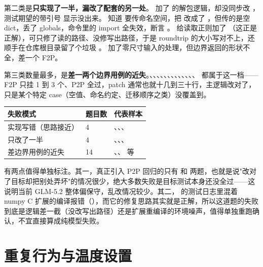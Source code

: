 \documentclass[UTF8,a4paper,11pt]{ctexart}
\begin{document}
第二类是\textbf{只实现了一半，漏改了配套的另一处}。 加了  的解包逻辑，却没同步改 ，测试期望的带引号  显示没出来。 知道  要传命名空间，把  改成了 ，但传的是空 dict，丢了 globals，命令里的 import 全失效，断言 。 给读取正则加了 （这正是正解），可只修了读的路径、没修写出路径，于是 roundtrip 的大小写对不上，还顺手在仓库根目录留了个垃圾 。 加了零尺寸输入的处理，但边界返回的形状不全，差一个 F2P。

第三类数量最多，是\textbf{差一两个边界用例的近失}。、、、、、、、、、、、、、 都属于这一档——F2P 只挂 1 到 3 个、P2P 全过，patch 通常也就十几到三十行，主逻辑改对了，只是某个特定 case（空值、命名约定、迁移顺序之类）没覆盖到。

\begin{center}
{\small
\begin{tabular}{L{3.6cm} C{1.4cm} L{8.6cm}}
\toprule
失败模式 & 题目数 & 代表样本 \\
\midrule
实现写错（思路接近） & 4 & 、、、 \\
只改了一半 & 4 & 、、、 \\
差边界用例的近失 & 14 & 、、 等 \\
\bottomrule
\end{tabular}
}
\end{center}

有两点值得单独标注。其一，真正引入 P2P 回归的只有  和  两题，也就是说"改对了目标却把别处弄坏"的情况很少，绝大多数失败是目标测试本身还没全过——这说明当前 GLM-5.2 整体偏保守，乱改情况较少。其二， 的测试日志里混着 numpy C 扩展的编译报错（），而它的修复思路其实就是正解，所以这道题的失败到底是逻辑差一截（没改写出路径）还是扩展重编译的环境噪声，值得单独重跑确认，不宜直接算成纯模型失败。

\section{重复行为与温度设置}
\end{document}
